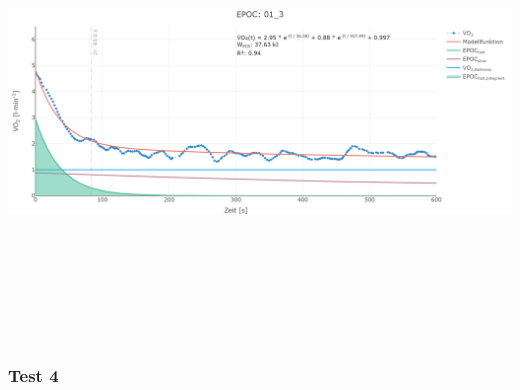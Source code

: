 \documentclass[
  letterpaper,
  DIV=11]{scrartcl}
\begin{document}
\includegraphics[width=11.45833in,height=4.6875in]{images/01_3.png}

\subsubsection{Test 4}
\end{document}
